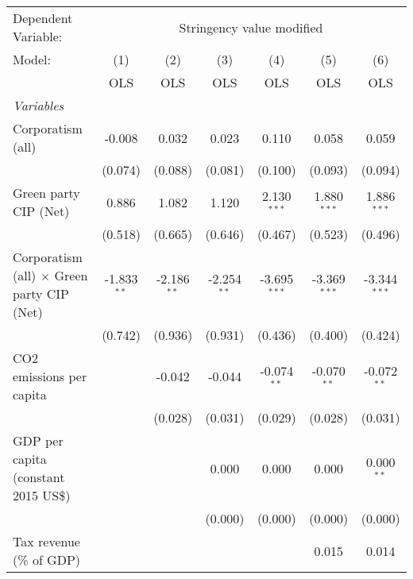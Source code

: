 
\begingroup
\centering
\begin{tabular}{lcccccc}
   \toprule
   Dependent Variable: & \multicolumn{6}{c}{Stringency value modified}\\
   Model:                                            & (1)           & (2)           & (3)           & (4)            & (5)            & (6)\\  
                                                     &  OLS          & OLS           & OLS           & OLS            & OLS            & OLS\\  
   \midrule
   \emph{Variables}\\
   Corporatism (all)                                 & -0.008        & 0.032         & 0.023         & 0.110          & 0.058          & 0.059\\   
                                                     & (0.074)       & (0.088)       & (0.081)       & (0.100)        & (0.093)        & (0.094)\\   
   Green party CIP (Net)                             & 0.886         & 1.082         & 1.120         & 2.130$^{***}$  & 1.880$^{***}$  & 1.886$^{***}$\\   
                                                     & (0.518)       & (0.665)       & (0.646)       & (0.467)        & (0.523)        & (0.496)\\   
   Corporatism (all) $\times$ Green party CIP (Net)  & -1.833$^{**}$ & -2.186$^{**}$ & -2.254$^{**}$ & -3.695$^{***}$ & -3.369$^{***}$ & -3.344$^{***}$\\   
                                                     & (0.742)       & (0.936)       & (0.931)       & (0.436)        & (0.400)        & (0.424)\\   
   CO2 emissions per capita                          &               & -0.042        & -0.044        & -0.074$^{**}$  & -0.070$^{**}$  & -0.072$^{**}$\\   
                                                     &               & (0.028)       & (0.031)       & (0.029)        & (0.028)        & (0.031)\\   
   GDP per capita (constant 2015 US\$)               &               &               & 0.000         & 0.000          & 0.000          & 0.000$^{**}$\\   
                                                     &               &               & (0.000)       & (0.000)        & (0.000)        & (0.000)\\   
   Tax revenue (\% of GDP)                           &               &               &               &                & 0.015          & 0.014\\   

\end{tabular}
